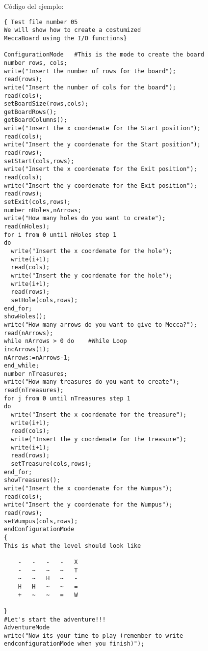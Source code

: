 \documentclass[a4paper,12pt,twoside,openright]{report}
\begin{document}
  Código del ejemplo:
  \begin{lstlisting}
{ Test file number 05
We will show how to create a costumized 
MeccaBoard using the I/O functions}

ConfigurationMode   #This is the mode to create the board
number rows, cols;
write("Insert the number of rows for the board");
read(rows);
write("Insert the number of cols for the board");
read(cols);
setBoardSize(rows,cols); 
getBoardRows();   
getBoardColumns();
write("Insert the x coordenate for the Start position");
read(cols);
write("Insert the y coordenate for the Start position");
read(rows);
setStart(cols,rows);
write("Insert the x coordenate for the Exit position");
read(cols);
write("Insert the y coordenate for the Exit position");
read(rows);
setExit(cols,rows);
number nHoles,nArrows;
write("How many holes do you want to create");   
read(nHoles);
for i from 0 until nHoles step 1
do
  write("Insert the x coordenate for the hole");
  write(i+1);
  read(cols);
  write("Insert the y coordenate for the hole");
  write(i+1);
  read(rows);
  setHole(cols,rows);
end_for;
showHoles();
write("How many arrows do you want to give to Mecca?");
read(nArrows);
while nArrows > 0 do    #While Loop
incArrows(1);
nArrows:=nArrows-1;
end_while;
number nTreasures;
write("How many treasures do you want to create");   
read(nTreasures);
for j from 0 until nTreasures step 1
do
  write("Insert the x coordenate for the treasure");
  write(i+1);
  read(cols);
  write("Insert the y coordenate for the treasure");
  write(i+1);
  read(rows);
  setTreasure(cols,rows);
end_for;
showTreasures();
write("Insert the x coordenate for the Wumpus");
read(cols);
write("Insert the y coordenate for the Wumpus");
read(rows);
setWumpus(cols,rows);
endConfigurationMode
{
This is what the level should look like

	-	-	-	-	X
	-	~	~	~	T
	~	~	H	~	-
	H	H	~	~	=
	+	~	~	=	W

}
#Let's start the adventure!!!
AdventureMode
write("Now its your time to play (remember to write 
endconfigurationMode when you finish)");
  \end{lstlisting}

%

%
\end{document}
